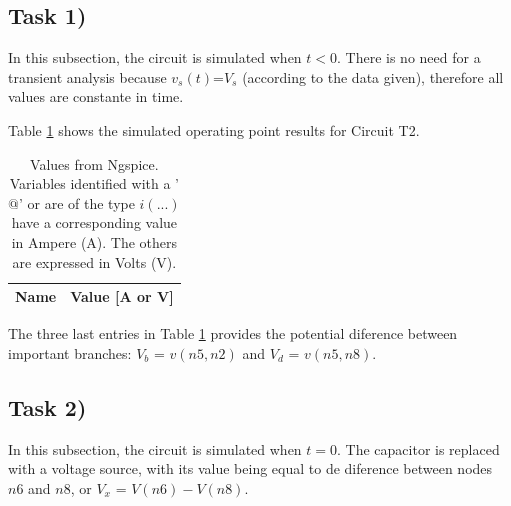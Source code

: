 \subsection{Task 1)}
\label{subsec:task1}


In this subsection, the circuit is simulated when $t<0$. There is no need for a
transient analysis because $v_s(t)$=$V_s$ (according to the data given), therefore
all values are constante in time. 

Table \ref{tab:op1} shows the simulated operating point results for Circuit T2.

\begin{table}[ht]
	\centering
	\begin{tabular}{|l|r|}
		\hline    
		{\bf Name} & {\bf Value [A or V]} \\ \hline
    		
	\end{tabular}
	
	\caption{Values from Ngspice. Variables identified with a '$@$' or are of the type
	$i(...)$ have a corresponding value in Ampere (A). The others are expressed in Volts (V).}
    
\label{tab:op1}
\end{table}

The three last entries in Table \ref{tab:op1} provides the potential diference between important
branches: $V_b$ = $v(n5,n2)$ and $V_d$ = $v(n5,n8)$.


\subsection{Task 2)}
\label{subsec:task2}


In this subsection, the circuit is simulated when $t=0$. The capacitor is replaced with a voltage source, 
with its value being equal to de diference between nodes $n6$ and $n8$, or $V_x$ = $V(n6)-V(n8)$.

